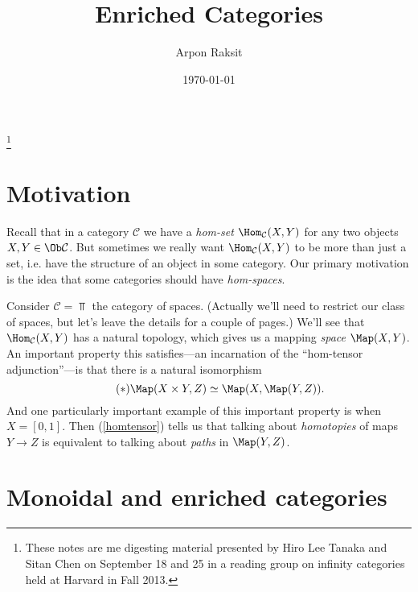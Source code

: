 


\title{Enriched Categories}
\author{Arpon Raksit}
\thanks{These notes are me digesting material presented by Hiro Lee
  Tanaka and Sitan Chen on September 18 and 25 in a reading group on
  infinity categories held at Harvard in Fall 2013.}
\date{\today}


\maketitle
\thispagestyle{fancy}


\renewcommand{\C}{\mathcal{C}}

\section{Motivation}

Recall that in a category $\C$ we have a \textit{hom-set}
$\Hom_\C(X,Y)$ for any two objects $X,Y \in \Ob \C$. But sometimes we
really want $\Hom_\C(X,Y)$ to be more than just a set, i.e. have the
structure of an object in some category. Our primary motivation is the
idea that some categories should have \textit{hom-spaces}.

\begin{example}
  Consider $\C = \Top$ the category of spaces. (Actually we'll need to
  restrict our class of spaces, but let's leave the details for a
  couple of pages.) We'll see that $\Hom_\C(X,Y)$ has a natural
  topology, which gives us a mapping \textit{space} $\Map(X,Y)$. An
  important property this satisfies---an incarnation of the
  ``hom-tensor adjunction''---is that there is a natural isomorphism
  \begin{equation}
    \label{homtensor}\tag{$\ast$}
    \Map(X \times Y, Z) \simeq \Map(X, \Map(Y, Z)).
  \end{equation}
  And one particularly important example of this important property is
  when $X = [0,1]$. Then (\ref{homtensor}) tells us that talking about
  \textit{homotopies} of maps $Y \to Z$ is equivalent to talking about
  \textit{paths} in $\Map(Y,Z)$.
\end{example}


\renewcommand{\T}{\mathcal{T}}

\section{Monoidal and enriched categories}

